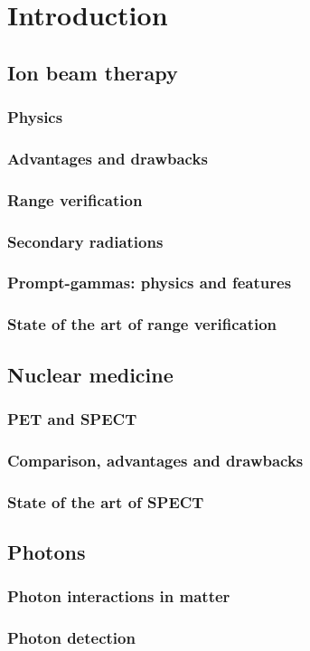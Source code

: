 \chapter{Introduction}\label{chap::1}

\section{Ion beam therapy}

\subsection{Physics}

\subsection{Advantages and drawbacks}

\subsection{Range verification}

\subsection{Secondary radiations}

\subsection{Prompt-gammas: physics and features}

\subsection{State of the art of range verification}


\section{Nuclear medicine}

\subsection{PET and SPECT}

\subsection{Comparison, advantages and drawbacks}

\subsection{State of the art of SPECT}


\section{Photons}

\subsection{Photon interactions in matter}

\subsection{Photon detection}


\clearpage
